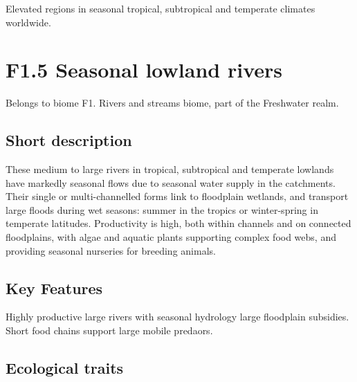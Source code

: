 \documentclass[
  letterpaper,
  DIV=11,
  numbers=noendperiod]{scrartcl}
\begin{document}
Elevated regions in seasonal tropical, subtropical and temperate
climates worldwide.

\section{F1.5 Seasonal lowland
rivers}\label{f1.5-seasonal-lowland-rivers}

Belongs to biome F1. Rivers and streams biome, part of the Freshwater
realm.

\subsection{Short description}\label{short-description-4}

These medium to large rivers in tropical, subtropical and temperate
lowlands have markedly seasonal flows due to seasonal water supply in
the catchments. Their single or multi-channelled forms link to
floodplain wetlands, and transport large floods during wet seasons:
summer in the tropics or winter-spring in temperate latitudes.
Productivity is high, both within channels and on connected floodplains,
with algae and aquatic plants supporting complex food webs, and
providing seasonal nurseries for breeding animals.

\subsection{Key Features}\label{key-features-4}

Highly productive large rivers with seasonal hydrology large floodplain
subsidies. Short food chains support large mobile predaors.

\subsection{Ecological traits}\label{ecological-traits-4}
\end{document}
